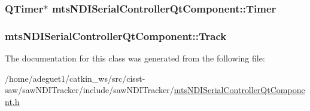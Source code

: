 \hypertarget{classmts_n_d_i_serial_controller_qt_component_af3a70b2ba9261bc5f975f35397adcd98}{
\subsubsection[{Timer}]{\setlength{\rightskip}{0pt plus 5cm}Q\-Timer$\ast$ mts\-N\-D\-I\-Serial\-Controller\-Qt\-Component\-::\-Timer\hspace{0.3cm}{\ttfamily [protected]}}}\label{classmts_n_d_i_serial_controller_qt_component_af3a70b2ba9261bc5f975f35397adcd98}
\hypertarget{classmts_n_d_i_serial_controller_qt_component_a66900ce8b560e20acd6b8676b8d2273b}{
\subsubsection[{Track}]{ mts\-N\-D\-I\-Serial\-Controller\-Qt\-Component\-::\-Track}}\label{classmts_n_d_i_serial_controller_qt_component_a66900ce8b560e20acd6b8676b8d2273b}


The documentation for this class was generated from the following file\-:\begin{DoxyCompactItemize}
\item 
/home/adeguet1/catkin\-\_\-ws/src/cisst-\/saw/saw\-N\-D\-I\-Tracker/include/saw\-N\-D\-I\-Tracker/\hyperlink{mts_n_d_i_serial_controller_qt_component_8h}{mts\-N\-D\-I\-Serial\-Controller\-Qt\-Component.\-h}\end{DoxyCompactItemize}
